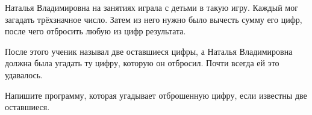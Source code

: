Наталья Владимировна на занятиях играла с детьми в такую игру. Каждый мог загадать трёхзначное число. Затем из него нужно было вычесть сумму его цифр, после чего отбросить любую из цифр результата.

После этого ученик называл две оставшиеся цифры, а Наталья Владимировна должна была угадать ту цифру, которую он отбросил. Почти всегда ей это удавалось.

Напишите программу, которая угадывает отброшенную цифру, если известны две оставшиеся.
